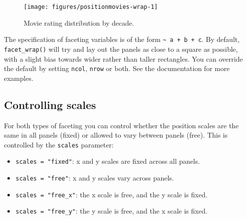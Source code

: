 \begin{Shaded}
\begin{Highlighting}[]
\StringTok{ }
 \StringTok{ }\NormalTok{),}
   \NormalTok{, } \NormalTok{) +}\StringTok{ }
\StringTok{  }\NormalTok{(~}\StringTok{ } \NormalTok{)}
\end{Highlighting}
\end{Shaded}

\begin{figure}

{\centering \texttt{[image: figures/positionmovies-wrap-1]} 

}

\caption{Movie rating distribution by decade.\label{fig:movies-wrap}}
\end{figure}

The specification of faceting variables is of the form
\texttt{\textasciitilde{} a + b + c}. By default, \texttt{facet\_wrap()}
will try and lay out the panels as close to a square as possible, with a
slight bias towards wider rather than taller rectangles. You can
override the default by setting \texttt{ncol}, \texttt{nrow} or both.
See the documentation for more examples.

\subsection{Controlling scales}\label{sub:controlling-scales}

For both types of faceting you can control whether the position scales
are the same in all panels (fixed) or allowed to vary between panels
(free). This is controlled by the \texttt{scales} parameter:

\begin{itemize}
\itemsep1pt\parskip0pt
\item
  \texttt{scales = "fixed"}: x and y scales are fixed across all panels.
\item
  \texttt{scales = "free"}: x and y scales vary across panels.
\item
  \texttt{scales = "free\_x"}: the x scale is free, and the y scale is
  fixed.
\item
  \texttt{scales = "free\_y"}: the y scale is free, and the x scale is
  fixed.
\end{itemize}

